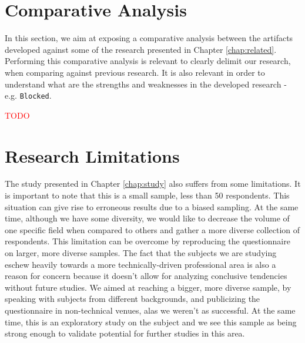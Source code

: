 \section{Comparative Analysis}

In this section, we aim at exposing a comparative analysis between the artifacts developed against some of the research presented in Chapter \ref{chap:related}. Performing this comparative analysis is relevant to clearly delimit our research, when comparing against previous research. It is also relevant in order to understand what are the strengths and weaknesses in the developed research - e.g. \texttt{Blocked}.

\textcolor{red}{TODO}

\section{Research Limitations}
\label{sec:eval-limitations}

The study presented in Chapter \ref{chap:study} also suffers from some limitations. It is important to note that this is a small sample, less than 50 respondents. This situation can give rise to erroneous results due to a biased sampling. At the same time, although we have some diversity, we would like to decrease the volume of one specific field when compared to others and gather a more diverse collection of respondents. This limitation can be overcome by reproducing the questionnaire on larger, more diverse samples. The fact that the subjects we are studying eschew heavily towards a more technically-driven professional area is also a reason for concern because it doesn't allow for analyzing conclusive tendencies without future studies. We aimed at reaching a bigger, more diverse sample, by speaking with subjects from different backgrounds, and publicizing the questionnaire in non-technical venues, alas we weren't as successful. At the same time, this is an exploratory study on the subject and we see this sample as being strong enough to validate potential for further studies in this area.

